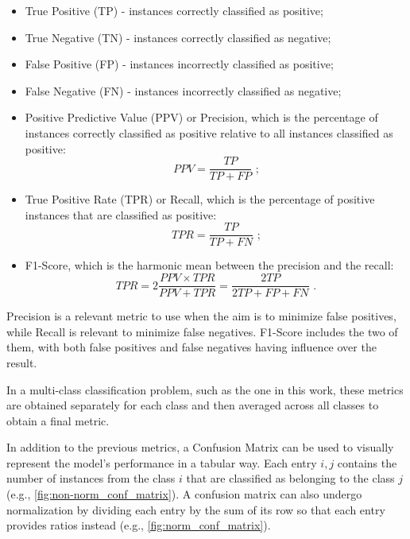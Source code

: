\begin{itemize}
    \item True Positive (TP) - instances correctly classified as positive;
    \item True Negative (TN) - instances correctly classified as negative;
    \item False Positive (FP) - instances incorrectly classified as positive;
    \item False Negative (FN) - instances incorrectly classified as negative;
    \item Positive Predictive Value (PPV) or Precision, which is the percentage of instances correctly classified as positive relative to all instances classified as positive: \begin{equation}PPV=\frac{TP}{TP+FP}\text{ ;}\label{eq:ppv}\end{equation}
    \item True Positive Rate (TPR) or Recall, which is the percentage of positive instances that are classified as positive: \begin{equation}TPR=\frac{TP}{TP+FN}\text{ ;}\label{eq:tpr}\end{equation}
    \item F1-Score, which is the harmonic mean between the precision and the recall: \begin{equation}TPR=2\frac{PPV \times TPR}{PPV+TPR}=\frac{2TP}{2TP+FP+FN}\text{ .}\label{eq:f1-score}\end{equation}
\end{itemize}

Precision is a relevant metric to use when the aim is to minimize false positives, while Recall is relevant to minimize false negatives. F1-Score includes the two of them, with both false positives and false negatives having influence over the result.

In a multi-class classification problem, such as the one in this work, these metrics are obtained separately for each class and then averaged across all classes to obtain a final metric.

In addition to the previous metrics, a Confusion Matrix can be used to visually represent the model's performance in a tabular way. Each entry $i,j$ contains the number of instances from the class $i$ that are classified as belonging to the class $j$ (e.g., \autoref{fig:non-norm_conf_matrix}). A confusion matrix can also undergo normalization by dividing each entry by the sum of its row so that each entry provides ratios instead (e.g., \autoref{fig:norm_conf_matrix}).

